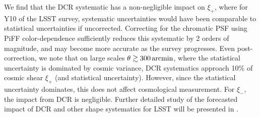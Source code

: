 We find that the DCR systematic has a non-negligible impact on $\xi_+$, where for Y10 of the LSST survey, systematic uncertainties would have been comparable to statistical uncertainties if uncorrected. 
Correcting for the chromatic PSF using PiFF color-dependence sufficiently reduces this systematic by 2 orders of magnitude, and may become more accurate as the survey progresses.
Even post-correction, we note that on large scales $\theta \gtrsim 300 \, \rm arcmin$, where the statistical uncertainty is dominated by cosmic variance, DCR systematics approach 10\% of cosmic shear $\xi_+$ (and statistical uncertainty).
However, since the statistical uncertainty dominates, this does not affect cosmological measurement.
For $\xi_-$, the impact from DCR is negligible.
Further detailed study of the forecasted impact of DCR and other shape systematics for LSST will be presented in  \citet{Agarwal2026}. 